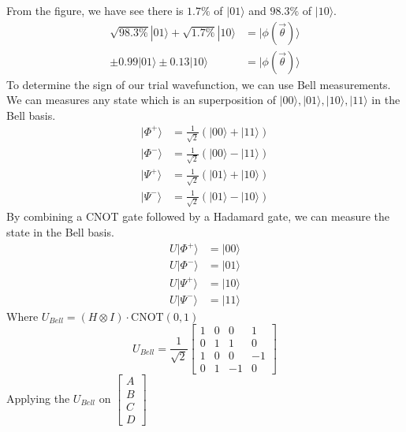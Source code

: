 \documentclass{article}
\begin{document}
\begin{itemize}
	      From the figure, we have see there is \(1.7 \% \) of \(|01\rangle\) and \(98.3 \%\) of \(|10\rangle\).
	      \begin{align*}
		      \sqrt{98.3 \%}|01\rangle +\sqrt{1.7 \% } |10\rangle & = |\phi(\vec{\theta}) \rangle \\
		      \pm 0.99 |01\rangle \pm 0.13 |10\rangle             & = |\phi(\vec{\theta}) \rangle
	      \end{align*}
	      To determine the sign of our trial wavefunction, we can use Bell measurements. We can measures any state which is an superposition of \(|00\rangle, |01\rangle, |10\rangle , |11\rangle\) in the Bell basis.
	      \begin{align*}
		      |\Phi^+\rangle & = \frac{1}{\sqrt{2}}(|00\rangle + |11\rangle) \\
		      |\Phi^-\rangle & = \frac{1}{\sqrt{2}}(|00\rangle - |11\rangle) \\
		      |\Psi^+\rangle & = \frac{1}{\sqrt{2}}(|01\rangle + |10\rangle) \\
		      |\Psi^-\rangle & = \frac{1}{\sqrt{2}}(|01\rangle - |10\rangle)
	      \end{align*}
	      By combining a CNOT gate followed by a Hadamard gate, we can measure the state in the Bell basis.
	      \begin{align*}
		      U |\Phi^+\rangle & = |00\rangle \\
		      U |\Phi^-\rangle & = |01\rangle \\
		      U |\Psi^+\rangle & = |10\rangle \\
		      U |\Psi^-\rangle & = |11\rangle
	      \end{align*}
	      Where \(U_{Bell} = \left( H \otimes I \right) \cdot \text{CNOT}(0,1)\)
	      \begin{equation*}
            U_{Bell} = \frac{1}{\sqrt{2}}\begin{bmatrix}
			      1 & 0 & 0  & 1  \\
			      0 & 1 & 1  & 0  \\
			      1 & 0 & 0  & -1 \\
			      0 & 1 & -1 & 0
		      \end{bmatrix}
	      \end{equation*}
	      Applying the \(U_{Bell}\) on \(\begin{bmatrix}
		      A \\
		      B \\
		      C \\
		      D
	      \end{bmatrix}\)

\end{itemize}
\end{document}
